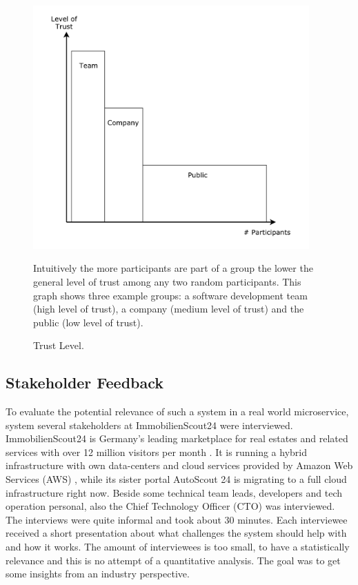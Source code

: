 \documentclass[a4paper,12pt]{scrartcl}
\begin{document}
\begin{figure}[H]
\centering
\includegraphics[width=300pt]{Images/TrustLevelGraph.pdf}
\caption{Trust Level.}
Intuitively the more participants are part of a group the lower the general level of trust among any two random participants. This graph shows three example groups: a software development team (high level of trust), a company (medium level of trust) and the public (low level of trust).
\label{fig:TrustLevelGraph}
\end{figure}

\subsection{Stakeholder Feedback}

To evaluate the potential relevance of such a system in a real world microservice, system several stakeholders at ImmobilienScout24 were interviewed. ImmobilienScout24 is Germany's leading marketplace for real estates and related services with over 12 million visitors per month \cite{web97}. It is running a hybrid infrastructure with own data-centers and cloud services provided by Amazon Web Services (AWS) \cite{web38}, while its sister portal AutoScout 24 is migrating to a full cloud infrastructure right now. Beside some technical team leads, developers and tech operation personal, also the Chief Technology Officer (CTO) was interviewed.\\

The interviews were quite informal and took about 30 minutes. Each interviewee received a short presentation about what challenges the system should help with and how it works. The amount of interviewees is too small, to have a statistically relevance and this is no attempt of a quantitative analysis. The goal was to get some insights from an industry perspective.\\
\end{document}
